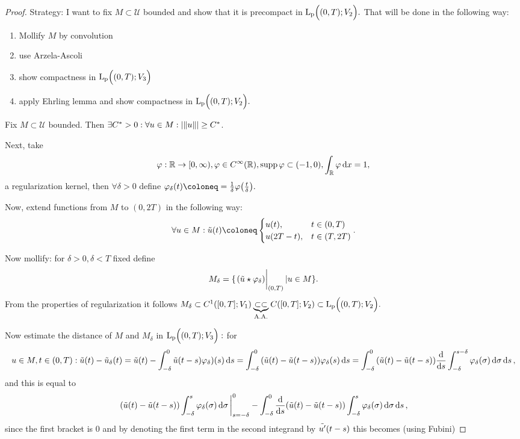 \documentclass{article}
\begin{document}
\begin{proof}
	Strategy: I want to fix $M \subset \mathcal{U}$ bounded and show that it is precompact in $\text{L}_{\text{p}}\!\,\Bigl( (0,T);V_2 \Bigr).$ That will be done in the following way:
	\begin{enumerate}
		\item Mollify $M$ by convolution
		\item use Arzela-Ascoli
		\item show compactness in $\text{L}_{\text{p}}\!\,\Bigl( (0,T);V_3 \Bigr)$
		\item apply Ehrling lemma and show compactness in $\text{L}_{\text{p}}\!\,\Bigl( (0,T);V_2 \Bigr).$
	\end{enumerate}

	Fix $M \subset \mathcal{U}$ bounded. Then $\exists C^{*} > 0: \forall u \in M: |\norm{u}| \geq C^{*}$. 

	Next, take
	\[
		\varphi : {\mathbb R} \to [0, \infty), \varphi \in C^{\infty}\qty({\mathbb R}), \operatorname{supp} \varphi \subset (-1,0), \int_{{\mathbb R}}\varphi\dd{x} = 1,
	\]
	a regularization kernel, then $\forall \delta >0$ define $\varphi_{\delta}(t) \coloneq = \frac{1}{\delta}\varphi\qty(\frac{t}{\delta}).$

	Now, extend functions from $M$ to $(0,2T)$ in the following way:
	\[
		\forall u \in M: \tilde{u}\qty(t) \coloneq \begin{cases}
			u(t), & t \in (0,T) \\
			u\qty(2T-t), & t \in (T,2T)
		\end{cases}.
	\]


	Now mollify: for $\delta >0, \delta <T $ fixed define
	\[
		M_{\delta} = \{\eval{\qty(\tilde{u} \star \varphi_{\delta})}_{(0,T)}| u \in M\}.
	\]
	From the properties of regularization it follows $M_{\delta} \subset C^1\qty([0,T]; V_1) \underbrace{\subset \subset}_{\, \text{A.A.} \,} C\qty([0,T];V_2) \subset \text{L}_{\text{p}}\!\,\Bigl( (0,T);V_2 \Bigr).$

	Now estimate the distance of $M$ and $M_{\delta}$ in $\text{L}_{\text{p}}\!\,\Bigl( (0,T);V_3 \Bigr):$ for
	\[
		u \in M, t \in (0,T): \tilde{u}(t) - \tilde{u}_{\delta}(t) = \tilde{u}(t) - \int_{-\delta}^0 \tilde{u}\qty(t-s)\varphi_{\delta})(s)\dd{s} = \int_{-\delta}^0\qty(\tilde{u}(t)-\tilde{u}\qty(t-s))\varphi_{\delta}(s)\dd{s} = \int_{-\delta}^0\qty(\tilde{u}(t)-\tilde{u}(t-s))\dv{s} \int_{-\delta}^{s-\delta}\varphi_{\delta}\qty(\sigma)\dd{\sigma}\dd{s},
	\]
	and this is equal to
	\[
		\eval{\qty(\tilde{u}(t)-\tilde{u}\qty(t-s))\int_{-\delta}^s \varphi_{\delta}\qty(\sigma)\dd{\sigma}}^0_{s=-\delta}- \int_{-\delta}^0 \dv{s} \qty(\tilde{u}(t)-\tilde{u}(t-s))\int_{-\delta}^s \varphi_{\delta}\qty(\sigma)\dd{\sigma}\dd{s},
	\]
	since the first bracket is $0$ and by denoting the first term in the second integrand by $\tilde{u'}\qty(t-s)$ this becomes (using Fubini)


\end{proof}
\end{document}
